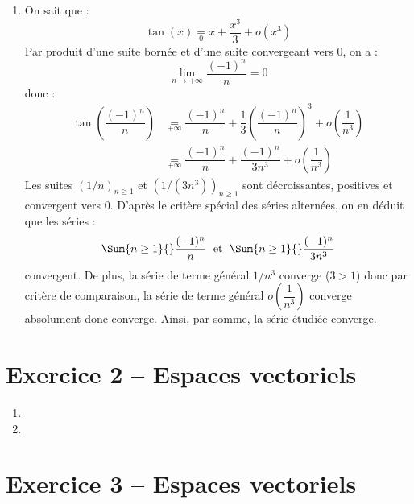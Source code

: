 \documentclass[a4paper,twoside,french,10pt]{VcCours}
\begin{document}
\begin{enumerate}
    \item On sait que :
    $$ \tan(x) \underset{0}{=} x + \dfrac{x^3}{3} + o(x^3)$$
    Par produit d'une suite bornée et d'une suite convergeant vers $0$, on a :
    $$ \lim_{n \rightarrow + \infty} \dfrac{(-1)^n}{n}=0$$
    donc :
    \begin{align*}
    \tan \left( \dfrac{(-1)^n}{n} \right) & \underset{+ \infty}{=} \dfrac{(-1)^n}{n} + \dfrac{1}{3}\left(\dfrac{(-1)^n}{n}\right)^3 + o \left( \dfrac{1}{n^3} \right) \\
    &\underset{+ \infty}{=}  \dfrac{(-1)^n}{n} + \dfrac{(-1)^n}{3n^3} + o \left( \dfrac{1}{n^3} \right) 
    \end{align*}
    Les suites $(1/n)_{n \geq 1}$ et $(1/(3n^3))_{n \geq 1}$ sont décroissantes, positives et convergent vers $0$. D'après le critère spécial des séries alternées, on en déduit que les séries :
    $$ \Sum{n \geq 1}{} \dfrac{(-1)^n}{n} \; \hbox{ et } \;  \Sum{n \geq 1}{} \dfrac{(-1)^n}{3n^3}$$
    convergent. De plus, la série de terme général $1/n^3$ converge ($3>1$) donc par critère de comparaison, la série de terme général $o \left( \dfrac{1}{n^3} \right)$ converge absolument donc converge. Ainsi, par somme, la série étudiée converge.
    \end{enumerate}

\section*{Exercice 2 -- Espaces vectoriels}
\begin{enumerate}
    \item 
    \item 
\end{enumerate}

  
\section*{Exercice 3 -- Espaces vectoriels}
\end{document}
